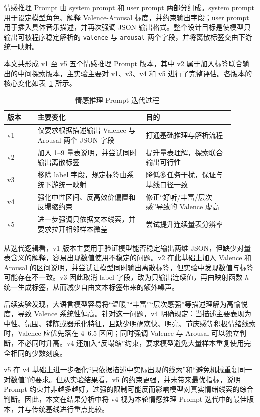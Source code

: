 情感推理 Prompt 由 system prompt 和 user prompt 两部分组成。system prompt 用于设定模型角色、解释 Valence-Arousal 标度，并约束输出字段；user prompt 用于插入具体音乐描述，并再次强调 JSON 输出格式。整个设计目标是使模型只输出可被程序稳定解析的 \texttt{valence} 与 \texttt{arousal} 两个字段，并将离散标签交由下游统一映射。

本文共形成 v1 至 v5 五个情感推理 Prompt 版本，其中 v2 属于加入标签联合输出的中间探索版本，主实验主要对 v1、v3、v4 和 v5 进行了完整评估。各版本的核心变化如表~\ref{tab:llm-prompt-iter} 所示。

\begin{table}[htbp]
  \centering
  \caption{情感推理 Prompt 迭代过程}
  \label{tab:llm-prompt-iter}
  \begin{tabular}{p{0.12\linewidth}p{0.43\linewidth}p{0.35\linewidth}}
    \hline
    版本 & 主要变化 & 目的 \\
    \hline
    v1 & 仅要求根据描述输出 Valence 与 Arousal 两个 JSON 字段 & 打通基础推理与解析流程 \\
    v2 & 加入 1--9 量表说明，并尝试同时输出离散标签 & 提升量表理解，探索联合输出可行性 \\
    v3 & 移除 label 字段，规定标签由系统下游统一映射 & 降低多任务干扰，保证与基线口径一致 \\
    v4 & 强化中性区间、反高效价偏置和反塌缩约束 & 修正“好听/丰富/层次感”导致的 Valence 虚高 \\
    v5 & 进一步强调只依据文本线索，并要求拉开相邻样本微差 & 尝试提升连续量表分辨率 \\
    \hline
  \end{tabular}
\end{table}

从迭代逻辑看，v1 版本主要用于验证模型能否稳定输出两维 JSON，但缺少对量表含义的解释，容易出现数值使用不稳定的问题。v2 在此基础上加入 Valence 和 Arousal 的区间说明，并尝试让模型同时输出离散标签，但实验中发现数值与标签可能存在不一致。v3 因此取消 label 字段，改为只输出连续值，再由映射函数 $h$ 统一生成标签，从而减少自由文本标签带来的额外噪声。

后续实验发现，大语言模型容易将“温暖”“丰富”“层次感强”等描述理解为高愉悦度，导致 Valence 系统性偏高。针对这一问题，v4 明确规定：当描述主要表现为中性、氛围、铺陈或器乐化特征，且缺少明确欢快、明亮、节庆感等积极情绪线索时，Valence 应优先落在 4--6.5 区间；同时强调 Valence 与 Arousal 可以独立判断，不必同时升高。v4 还加入“反塌缩”约束，要求模型避免大量样本重复使用完全相同的少数刻度。

v5 在 v4 基础上进一步强化“只依据描述中实际出现的线索”和“避免机械重复同一对数值”的要求。但从实验结果看，v5 的约束更强，并未带来最优指标，说明 Prompt 约束并非越多越好，过强的限制可能反而影响模型对真实情绪线索的综合判断。因此，本文在结果分析中将 v4 视为本轮情感推理 Prompt 迭代中的最佳版本，并与传统基线进行重点比较。

